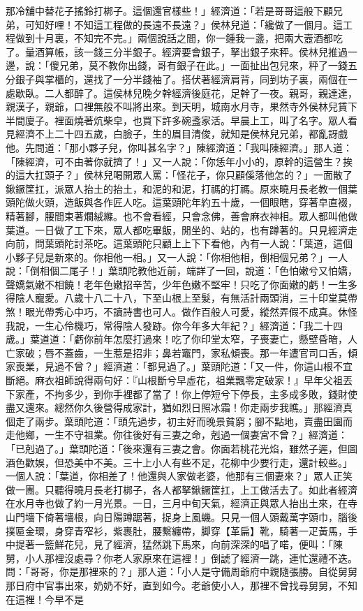 那冷舖中替花子搖鈴打梆子。這個還官樣些！」經濟道：「若是哥哥這般下顧兄弟，可知好哩！不知這工程做的長遠不長遠？」侯林兒道：「纔做了一個月。這工程做到十月裏，不知完不完。」兩個說話之間，你一鍾我一盞，把兩大壼酒都吃了。量酒算帳，該一錢三分半銀子。經濟要會銀子，拏出銀子來秤。侯林兒推過一邊，說：「傻兄弟，莫不教你出錢，哥有銀子在此。」一面扯出包兒來，秤了一錢五分銀子與掌櫃的，還找了一分半錢袖了。搭伏著經濟肩背，同到坊子裏，兩個在一處歇臥。二人都醉了。這侯林兒晚夕幹經濟後庭花，足幹了一夜。親哥，親達達，親漢子，親爺，口裡無般不叫將出來。到天明，城南水月寺，果然寺外侯林兒賃下半間廈子。裡面燒著炕柴皁，也買下許多碗盞家活。早晨上工，叫了名字。眾人看見經濟不上二十四五歲，白臉子，生的眉目清俊，就知是侯林兒兄弟，都亂訝戲他。先問道：「那小夥子兒，你叫甚名字？」陳經濟道：「我叫陳經濟。」那人道：「陳經濟，可不由著你就擠了！」又一人說：「你恁年小小的，原幹的這營生？挨的這大扛頭子？」侯林兒喝開眾人罵：「怪花子，你只顧傒落他怎的？」一面散了鍬鐝筐扛，派眾人抬土的抬土，和泥的和泥，打禡的打禡。原來曉月長老教一個葉頭陀做火頭，造飯與各作匠人吃。這葉頭陀年約五十歲，一個眼瞎，穿著皁直裰，精著腳，腰間束著爛絨縧。也不會看經，只會念佛，善會麻衣神相。眾人都叫他做葉道。一日做了工下來，眾人都吃畢飯，閒坐的、站的，也有蹲著的。只見經濟走向前，問葉頭陀討茶吃。這葉頭陀只顧上上下下看他，內有一人說：「葉道，這個小夥子兒是新來的。你相他一相。」又一人說：「你相他相，倒相個兄弟？」一人說：「倒相個二尾子！」葉頭陀教他近前，端詳了一回，說道：「色怕嫩兮又怕嬌，聲嬌氣嫩不相饒！老年色嫩招辛苦，少年色嫩不堅牢！只吃了你面嫩的虧！一生多得陰人寵愛。八歲十八二十八，下至山根上至髮，有無活計兩頭消，三十印堂莫帶煞！眼光帶秀心中巧，不讀詩書也可人。做作百般人可愛，縱然弄假不成真。休怪我說，一生心伶機巧，常得陰人發跡。你今年多大年紀？」經濟道：「我二十四歲。」葉道道：「虧你前年怎麼打過來！吃了你印堂太窄，子喪妻亡，懸壁昏暗，人亡家破；唇不蓋齒，一生惹是招非；鼻若竈門，家私傾喪。那一年遭官司口舌，傾家喪業，見過不曾？」經濟道：「都見過了。」葉頭陀道：「又一件，你這山根不宜斷絕。麻衣祖師說得兩句好：『山根斷兮早虛花，祖業飄零定破家！』早年父祖丟下家產，不拘多少，到你手裡都了當了！你上停短兮下停長，主多成多敗，錢財使盡又還來。總然你久後營得成家計，猶如烈日照冰霜！你走兩步我瞧。」那經濟真個走了兩步。葉頭陀道：「頭先過步，初主好而晚景貧窮；腳不點地，賣盡田園而走他鄉，一生不守祖業。你往後好有三妻之命，剋過一個妻宮不曾？」經濟道：「已剋過了。」葉頭陀道：「後來還有三妻之會。你面若桃花光焰，雖然子遲，但圖酒色歡娛，但恐美中不美。三十上小人有些不足，花柳中少要行走，還計較些。」一個人說：「葉道，你相差了！他還與人家做老婆，他那有三個妻來？」眾人正笑做一團。只聽得曉月長老打梆子，各人都拏鍬鐝筐扛，上工做活去了。如此者經濟在水月寺也做了約一月光景。一日，三月中旬天氣，經濟正與眾人抬出土來，在寺山門墻下倚著墻根，向日陽蹲踞著，捉身上風蟣。只見一個人頭戴萬字頭巾，腦後撲匾金環，身穿青窄衫，紫裹肚，腰繫纏帶，脚穿【革扁】靴，騎著一疋黃馬，手中提著一籃鮮花兒，見了經濟，猛然跳下馬來，向前深深的唱了喏，便叫：「陳舅，小人那裡沒處尋？你老人家原來在這裡！」倒諕了經濟一跳，連忙還禮不迭。問：「哥哥，你是那裡來的？」那人道：「小人是守備周爺府中親隨張勝。自從舅舅那日府中官事出來，奶奶不好，直到如今。老爺使小人，那裡不曾找尋舅舅，不知在這裡！今早不是
